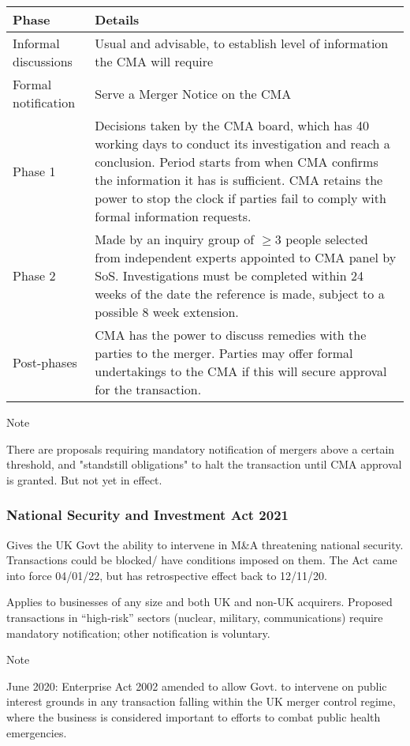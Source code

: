 \documentclass[
]{article}
\begin{document}
\begin{longtable}[]{@{}ll@{}}
\toprule()
Phase & Details \\
\midrule()
\endhead
Informal discussions & Usual and advisable, to establish level of
information the CMA will require \\
Formal notification & Serve a Merger Notice on the CMA \\
Phase 1 & Decisions taken by the CMA board, which has 40 working days to
conduct its investigation and reach a conclusion. Period starts from
when CMA confirms the information it has is sufficient. CMA retains the
power to stop the clock if parties fail to comply with formal
information requests. \\
Phase 2 & Made by an inquiry group of {\(\geq 3\)} people selected from
independent experts appointed to CMA panel by SoS. Investigations must
be completed within 24 weeks of the date the reference is made, subject
to a possible 8 week extension. \\
Post-phases & CMA has the power to discuss remedies with the parties to
the merger. Parties may offer formal undertakings to the CMA if this
will secure approval for the transaction. \\
\bottomrule()
\end{longtable}

Note

There are proposals requiring mandatory notification of mergers above a
certain threshold, and "standstill obligations" to halt the transaction
until CMA approval is granted. But not yet in effect.

\hypertarget{national-security-and-investment-act-2021}{%
\subsubsection{National Security and Investment Act
2021}\label{national-security-and-investment-act-2021}}

Gives the UK Govt the ability to intervene in M\&A threatening national
security. Transactions could be blocked/ have conditions imposed on
them. The Act came into force 04/01/22, but has retrospective effect
back to 12/11/20.

Applies to businesses of any size and both UK and non-UK acquirers.
Proposed transactions in ``high-risk'' sectors (nuclear, military,
communications) require mandatory notification; other notification is
voluntary.

Note

June 2020: Enterprise Act 2002 amended to allow Govt. to intervene on
public interest grounds in any transaction falling within the UK merger
control regime, where the business is considered important to efforts to
combat public health emergencies.
\end{document}
